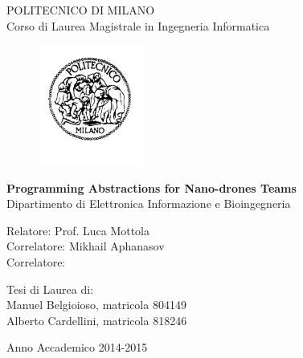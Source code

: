 \thispagestyle{empty}
\vspace*{-1.5cm} \bfseries{
\begin{center}
  \large
  POLITECNICO DI MILANO\\
  \normalsize
  Corso di Laurea Magistrale in Ingegneria Informatica\\
  
  \begin{figure}[htbp]
    \begin{center}
      \includegraphics[width=3.5cm]{./pictures/logopm}
    \end{center}
  \end{figure}
  \vspace*{0.3cm} \LARGE



  \textbf{Programming Abstractions for Nano-drones Teams}\\



  \vspace*{.75truecm} \large
  Dipartimento di Elettronica Informazione e Bioingegneria\\
\end{center}
\vspace*{3.0cm} \large
\begin{flushleft}


  Relatore: Prof. Luca Mottola \\
  Correlatore:  Mikhail Aphanasov\\
  Correlatore:  \\


\end{flushleft}
\vspace*{1.0cm}
\begin{flushright}


  Tesi di Laurea di:\\ Manuel Belgioioso, matricola 804149 \\ 
		       Alberto Cardellini, matricola 818246  \\


\end{flushright}
\vspace*{0.5cm}
\begin{center}



  Anno Accademico 2014-2015
\end{center} \clearpage
}